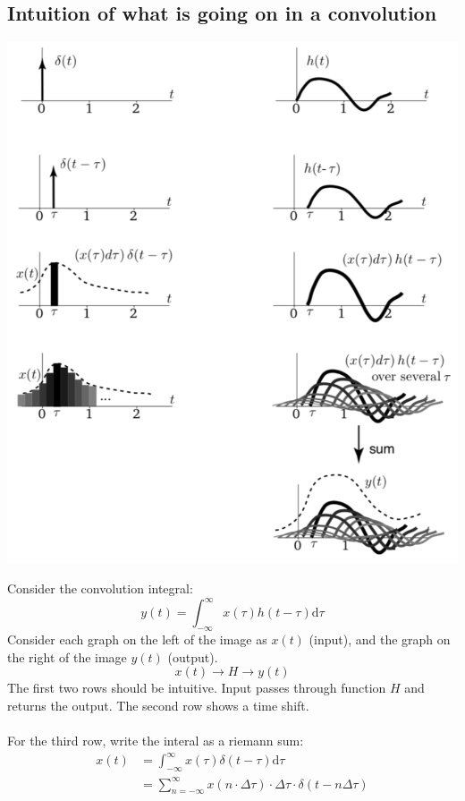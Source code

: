 \documentclass[10pt]{article}
\begin{document}
\subsection*{Intuition of what is going on in a convolution}
\begin{center}
    \includegraphics[scale=0.6]{W3_3.png}
\end{center}
Consider the convolution integral:
\[y(t) = \int_{-\infty}^\infty x(\tau) h(t - \tau) \text{d}\tau\]
Consider each graph on the left of the image as $x(t)$ (input), and the graph on the right of the image $y(t)$ (output).
\[x(t) \longrightarrow \boxed{H} \longrightarrow y(t)\]
The first two rows should be intuitive.  Input passes through function $H$ and returns the output.  The second row shows a time shift.\\\\
For the third row, write the interal as a riemann sum:
\begin{align*}
    x(t) &= \int_{-\infty}^\infty x(\tau) \delta(t - \tau) \text{d}\tau\\
    &= \sum_{n = -\infty}^\infty x(n \cdot \Delta \tau) \cdot \Delta \tau \cdot \delta(t - n \Delta \tau)
\end{align*}
\end{document}
